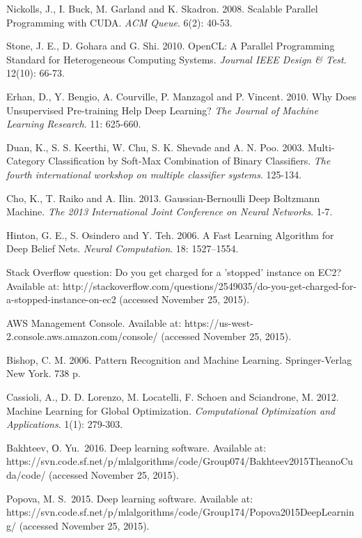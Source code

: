\documentclass[12pt]{article}
\begin{document}
\begin{thebibliography}{10}
{Nickolls, J., I. Buck, M. Garland and K. Skadron.}
2008. Scalable Parallel Programming with CUDA. \emph{ACM Queue}. 6(2): 40-53.

{Stone, J. E., D. Gohara and G. Shi.}
2010. OpenCL: A Parallel Programming Standard for Heterogeneous Computing Systems.
\emph{Journal
IEEE Design \& Test}. 12(10): 66-73.

{Erhan, D.,
Y. Bengio,
A. Courville,
P. Manzagol and
P. Vincent.}
2010. Why Does Unsupervised Pre-training Help Deep Learning? \emph{The Journal of Machine Learning Research}. 11: 625-660.


{ Duan, K., S. S. Keerthi, W. Chu, S. K. Shevade and A. N.
Poo.}
2003. Multi-Category Classification by Soft-Max
Combination of Binary Classifiers. \emph{The
fourth international workshop on multiple classifier systems}. 125-134.


{Cho, K., T. Raiko and A. Ilin.}
2013. Gaussian-Bernoulli Deep Boltzmann Machine. \emph{The 2013 International Joint Conference on Neural Networks}. 1-7.

{Hinton, G. E., S. Osindero and Y. Teh.}
2006. A Fast Learning Algorithm for Deep Belief Nets. \emph{Neural Computation}. 18: 1527–1554.

Stack Overflow question: Do you get charged for a 'stopped' instance on EC2? Available at: http://stackoverflow.com/questions/2549035/do-you-get-charged-for-a-stopped-instance-on-ec2 (accessed November 25, 2015).


AWS Management Console. Available at: https://us-west-2.console.aws.amazon.com/console/ (accessed November 25, 2015).

{Bishop, C. M.}
2006. Pattern Recognition and Machine Learning. Springer-Verlag New York. 738 p.


{Cassioli, A., D. D. Lorenzo, M. Locatelli, F. Schoen and Sciandrone, M.}
2012. Machine Learning for Global Optimization. \emph{Computational Optimization and Applications}. 1(1): 279-303.


{Bakhteev, О. Yu.}~2016. Deep learning software.
Available at: https://svn.code.sf.net/p/mlalgorithms/code/Group074/Bakhteev2015TheanoCuda/code/ (accessed November 25, 2015).


{Popova, M. S.}~2015. Deep learning software.
Available at: https://svn.code.sf.net/p/mlalgorithms/code/Group174/Popova2015DeepLearning/ (accessed November 25, 2015).
\end{thebibliography}
\end{document}
